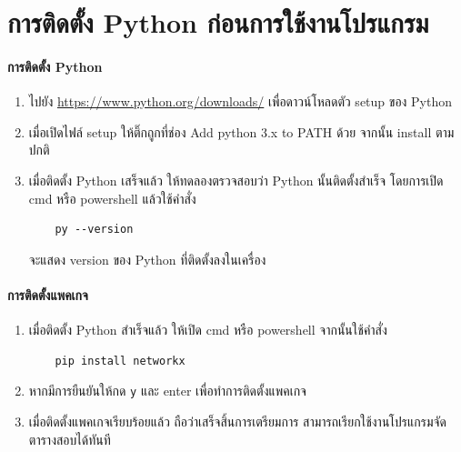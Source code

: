 \section{การติดตั้ง Python ก่อนการใช้งานโปรแกรม}

\paragraph{การติดตั้ง Python}
\begin{enumerate}
  \item ไปยัง \url{https://www.python.org/downloads/} เพื่อดาวน์โหลดตัว setup ของ Python
  \item เมื่อเปิดไฟล์ setup ให้ติ๊กถูกที่ช่อง Add python 3.x to PATH ด้วย จากนั้น install ตามปกติ
  \item เมื่อติดตั้ง Python เสร็จแล้ว ให้ทดลองตรวจสอบว่า Python นั้นติดตั้งสำเร็จ โดยการเปิด cmd หรือ powershell แล้วใช้คำสั่ง 
  \begin{verbatim}
    py --version
  \end{verbatim}
  จะแสดง version ของ Python ที่ติดตั้งลงในเครื่อง
\end{enumerate}

\paragraph{การติดตั้งแพคเกจ }
\begin{enumerate}
  \item เมื่อติดตั้ง Python สำเร็จแล้ว ให้เปิด cmd หรือ powershell จากนั้นใช้คำสั่ง
  \begin{verbatim}
    pip install networkx
  \end{verbatim}
  \item หากมีการยืนยันให้กด \verb+y+ และ enter เพื่อทำการติดตั้งแพคเกจ
  \item เมื่อติดตั้งแพคเกจเรียบร้อยแล้ว ถือว่าเสร็จสิ้นการเตรียมการ สามารถเรียกใช้งานโปรแกรมจัดตารางสอบได้ทันที
\end{enumerate}

